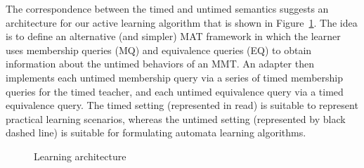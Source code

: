 The correspondence between the timed and untimed semantics suggests an architecture for our active learning algorithm that is shown in Figure~\ref{architecture}.
The idea is to define an alternative (and simpler) MAT framework in which the learner uses membership queries (MQ) and equivalence queries (EQ)
to obtain information about the untimed behaviors of an MMT.
An adapter then implements each untimed membership query via a series of timed membership queries for the timed teacher,
and each untimed equivalence query via a timed equivalence query.
The timed setting (represented in read)
is suitable to represent practical learning scenarios, whereas the
untimed setting (represented by black dashed line)
is suitable for formulating automata learning
algorithms. 
\begin{figure}[b]
\ifshort
\vspace{-2em}
\fi
\begin{center}
\end{center}
\caption{Learning architecture}
\label{architecture}
\end{figure}

